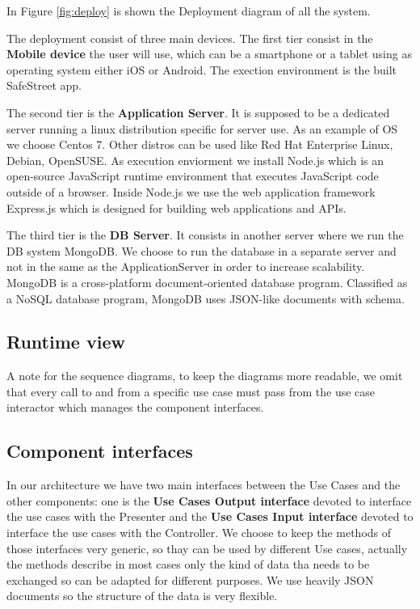 In Figure \ref{fig:deploy} is shown the Deployment diagram of all the system.

The deployment consist of three main devices. The first tier consist in the \textbf{Mobile device} the user will use, which can be a smartphone or a tablet using as operating system either iOS or Android.
The exection environment is the built SafeStreet app.


The second tier is the \textbf{Application Server}. It is supposed to be a dedicated server running a linux distribution specific for server use. As an example of OS we choose Centos 7. Other distros can be used like Red Hat Enterprise Linux, Debian, OpenSUSE.
As execution enviorment we install Node.js which is an open-source JavaScript runtime environment that executes JavaScript code outside of a browser. Inside Node.js we use the web application framework Express.js which is designed for building web applications and APIs.

The third tier is the \textbf{DB Server}. It consists in another server where we run the DB system MongoDB. We choose to run the database in a separate server and not in the same as the ApplicationServer in order to increase scalability. MongoDB is a cross-platform document-oriented database program. Classified as a NoSQL database program, MongoDB uses JSON-like documents with schema.

\subsection{Runtime view}
A note for the sequence diagrams, to keep the diagrams more readable, we omit that every call to and from a specific use case must pass from the use case interactor which manages the component interfaces.
 \label{sequencespart}

\subsection{Component interfaces}
In our architecture we have two main interfaces between the Use Cases and the other components: one is the \textbf{Use Cases Output interface} devoted to interface the use cases with the Presenter and the \textbf{Use Cases Input interface} devoted to interface the use cases with the Controller.
We choose to keep the methods of those interfaces very generic, so thay can be used by different Use cases, actually the methods describe in most cases only the kind of data tha needs to be exchanged so can be adapted for different purposes. We use heavily JSON documents so the structure of the data is very flexible.

